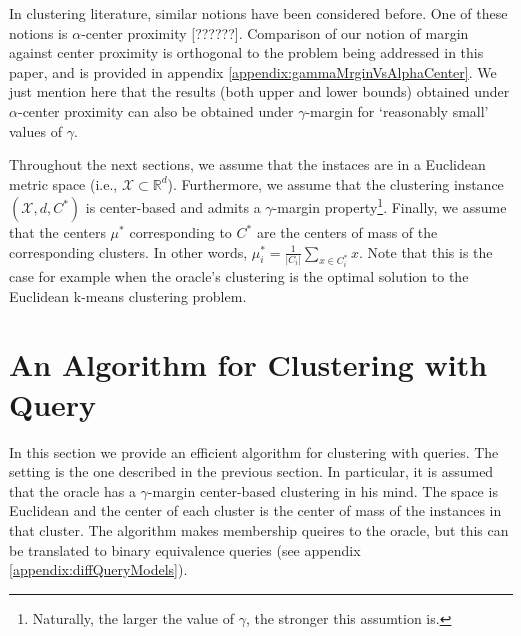 \documentclass[orivec]{llncs}
\newcommand{\mc}{\mathcal}
\begin{document}


In clustering literature, similar notions have been considered before. One of these notions is $\alpha$-center proximity [??????]. Comparison of our notion of margin against center proximity is orthogonal to the problem being addressed in this paper, and is provided in appendix \ref{appendix:gammaMrginVsAlphaCenter}. We just mention here that the results (both upper and lower bounds) obtained under $\alpha$-center proximity can also be obtained under $\gamma$-margin for `reasonably small' values of $\gamma$.
 
Throughout the next sections, we assume that the instaces are in a Euclidean metric space (i.e., $\mc X\subset \mathbb{R}^d$). Furthermore, we assume that the clustering instance $(\mc X, d, C^*)$ is center-based and admits a $\gamma$-margin property\footnote{Naturally, the larger the value of $\gamma$, the stronger this assumtion is.}. Finally, we assume that the centers $\mu^*$ corresponding to $C^*$ are the centers of mass of the corresponding clusters. In other words, $\mu^*_i=\frac{1}{|C_i|}\sum_{x\in C^*_i} x$. Note that this is the case for example when the oracle's clustering is the optimal solution to the Euclidean k-means clustering problem.

\section{An Algorithm for Clustering with Query}
\label{section:clusteringWithQuery}

In this section we provide an efficient algorithm for clustering with queries. The setting is the one described in the previous section. In particular, it is assumed that the oracle has a $\gamma$-margin center-based clustering in his mind. The space is Euclidean and the center of each cluster is the center of mass of the instances in that cluster. The algorithm makes membership queires to the oracle, but this can be translated to binary equivalence queries (see appendix \ref{appendix:diffQueryModels}). 
\end{document}
